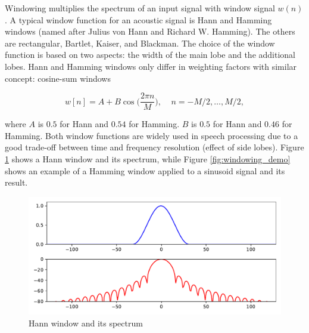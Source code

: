Windowing multiplies the spectrum of an input signal with window signal $w(n)$.
A typical window function for an acoustic signal is Hann and Hamming windows
(named after Julius von Hann and Richard W. Hamming).  The others are
rectangular, Bartlet, Kaiser, and Blackman.  The choice of the window function
is based on two aspects: the width of the main lobe and the additional lobes.
Hann and Hamming windows only differ in weighting factors with similar concept:
cosine-sum windows

\begin{equation}
  w[n] = A + B \cos \biggl(\frac {2\pi n}{M}\biggl), ~~~~~n = -M/2, \ldots, M/2,
\end{equation}

\noindent where $A$ is $0.5$ for Hann and $0.54$ for Hamming. $B$ is $0.5$ for
Hann and $0.46$ for Hamming. Both window functions are widely used in speech
processing due to a good trade-off between time and frequency resolution
(effect of side lobes). Figure \ref{fig:window_hann} shows a Hann window and
its spectrum, while Figure \ref{fig:windowing_demo} shows an example of a
Hamming window applied to a sinusoid signal and its result.

\begin{figure}[htbp]
  \centering
  \includegraphics[width=\textwidth]{../fig/window_hann.pdf}
  \caption{Hann window and its spectrum}
  \label{fig:window_hann}
\end{figure}

